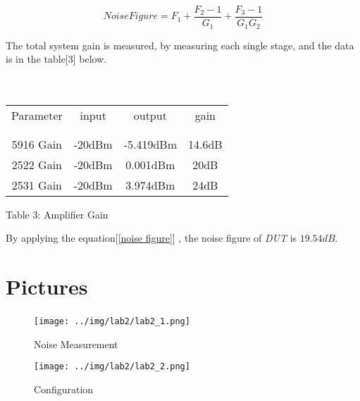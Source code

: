 \documentclass[]{article}
\begin{document}
\begin{equation}
    Noise Figure = F_{1} + \frac{F_{2} - 1}{G_{1}} + \frac{F_{3} - 1}{G_{1}G_{2}}
    \label{cascading amplifiers}
\end{equation}

The total system gain is measured, by measuring each single stage, and the data is 
in the table[3] below. \\ \\ \\

\begin{center}
    \begin{tabular}{c c c c}
        Parameter & input & output & gain\\ \\ \hline \\
        5916 Gain  & -20dBm & -5.419dBm & 14.6dB\\
        2522 Gain  & -20dBm & 0.001dBm & 20dB\\
        2531 Gain  & -20dBm & 3.974dBm & 24dB
    \end{tabular}
\end{center}

\begin{center}
    Table 3: Amplifier Gain
\end{center}

By applying the equation[\ref{noise figure}] , the noise figure of \textit{DUT} is $19.54dB$.

\section{Pictures}

\begin{figure}[p]
    \begin{center}
            \texttt{[image: ../img/lab2/lab2\_1.png]}~
            \caption{Noise Measurement}
    \end{center}
\end{figure}

\begin{figure}[p]
    \begin{center}
            \texttt{[image: ../img/lab2/lab2\_2.png]}
            \caption{Configuration}
    \end{center}
\end{figure}
\end{document}
